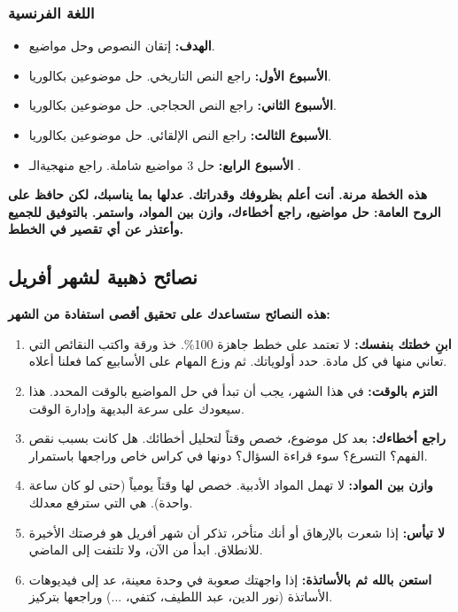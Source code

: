 \documentclass[12pt,a4paper]{book}
\newcommand{\importantAr}[1]{%
	\begin{important}
		\bfseries #1
	\end{important}
}
\begin{document}
	\subsubsection*{اللغة الفرنسية}
	\begin{itemize}
		\item \textbf{الهدف:} إتقان النصوص  وحل مواضيع.
		\item \textbf{الأسبوع الأول:} راجع النص التاريخي. حل موضوعين بكالوريا.
		\item \textbf{الأسبوع الثاني:} راجع النص الحجاجي. حل موضوعين بكالوريا.
		\item \textbf{الأسبوع الثالث:} راجع النص الإلقائي. حل موضوعين بكالوريا.
		\item \textbf{الأسبوع الرابع:} حل 3 مواضيع شاملة. راجع منهجية\newline الـ .
	\end{itemize}
	
	
	\importantAr{هذه الخطة مرنة. أنت أعلم بظروفك وقدراتك. عدلها بما يناسبك، لكن حافظ على الروح العامة: حل مواضيع، راجع أخطاءك، وازن بين المواد، واستمر. بالتوفيق للجميع وأعتذر عن أي تقصير في الخطط.}
	
	
	\subsection{نصائح ذهبية لشهر أفريل}
	\label{sec:after-exams-reorganization4}
	\label{sec:random-tips6}
	
	\importantAr{هذه النصائح ستساعدك على تحقيق أقصى استفادة من الشهر:}
	\begin{enumerate}
		\item \textbf{ابنِ خطتك بنفسك:} لا تعتمد على خطط جاهزة 100\%. خذ ورقة واكتب النقائص التي تعاني منها في كل مادة. حدد أولوياتك. ثم وزع المهام على الأسابيع كما فعلنا أعلاه.
		\item \textbf{التزم بالوقت:} في هذا الشهر، يجب أن تبدأ في حل المواضيع بالوقت المحدد. هذا سيعودك على سرعة البديهة وإدارة الوقت.
		\item \textbf{راجع أخطاءك:} بعد كل موضوع، خصص وقتاً لتحليل أخطائك. هل كانت بسبب نقص الفهم؟ التسرع؟ سوء قراءة السؤال؟ دونها في كراس خاص وراجعها باستمرار.
		\item \textbf{وازن بين المواد:} لا تهمل المواد الأدبية. خصص لها وقتاً يومياً (حتى لو كان ساعة واحدة). هي التي سترفع معدلك.
		\item \textbf{لا تيأس:} إذا شعرت بالإرهاق أو أنك متأخر، تذكر أن شهر أفريل هو فرصتك الأخيرة للانطلاق. ابدأ من الآن، ولا تلتفت إلى الماضي.
		\item \textbf{استعن بالله ثم بالأساتذة:} إذا واجهتك صعوبة في وحدة معينة، عد إلى فيديوهات الأساتذة (نور الدين، عبد اللطيف، كتفي، ...) وراجعها بتركيز.
	\end{enumerate}
	
\end{document}
